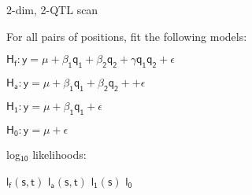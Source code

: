 \documentclass[aspectratio=169,12pt,t]{beamer}
\begin{document}
\begin{frame}[c]{2-dim, 2-QTL scan}

\hfill \begin{minipage}[t]{10in}
For all pairs of positions, fit the following models:

\vspace{10mm}

\hfill
\begin{minipage}{9in}
{\lolit
$\mathsf{\text{H}_f: y = \mu + \beta_1 q_1 + \beta_2 q_2 +
      \gamma q_1 q_2 + \epsilon}$

\vspace{5mm}

$\mathsf{\text{H}_a: y = \mu + \beta_1 q_1 + \beta_2 q_2 +
      + \epsilon}$

\vspace{5mm}

$\mathsf{\text{H}_1: y = \mu + \beta_1 q_1 + \epsilon}$

\vspace{5mm}

$\mathsf{\text{H}_0: y = \mu + \epsilon}$

}
\end{minipage}

\vspace{20mm}

log$_{\mathsf{10}}$ likelihoods:

\vspace{5mm}

\hfill
\begin{minipage}{9in}
{\lolit

$\mathsf{l_f(s,t)}$ \hspace{2cm}
$\mathsf{l_a(s,t)}$ \hspace{2cm}
$\mathsf{l_1(s)}$ \hspace{2cm}
$\mathsf{l_0}$ \hspace{2cm}
}
\end{minipage}


\end{minipage}


\end{frame}
\end{document}
